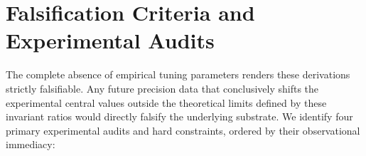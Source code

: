 
\section{Falsification Criteria and Experimental Audits}

The complete absence of empirical tuning parameters renders these derivations strictly falsifiable. Any future precision data that conclusively shifts the experimental central values outside the theoretical limits defined by these invariant ratios would directly falsify the underlying substrate. We identify four primary experimental audits and hard constraints, ordered by their observational immediacy:

